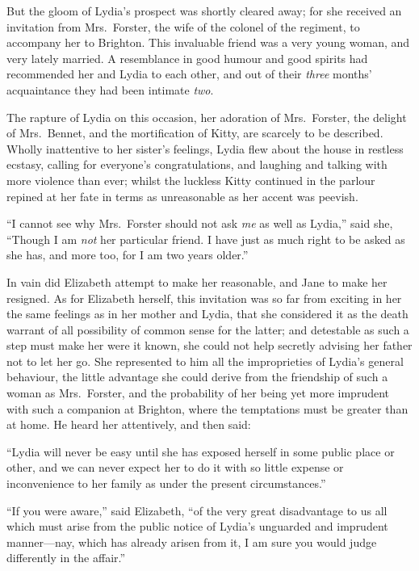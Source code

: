 \documentclass[12pt,english]{book}
\begin{document}
But the gloom of Lydia's prospect was shortly cleared away; for she
received an invitation from Mrs.\ Forster, the wife of the colonel
of the regiment, to accompany her to Brighton. This invaluable friend
was a very young woman, and very lately married. A resemblance in
good humour and good spirits had recommended her and Lydia to each
other, and out of their \textit{three} months' acquaintance they had
been intimate \textit{two}.

The rapture of Lydia on this occasion, her adoration of Mrs.\ Forster,
the delight of Mrs.\ Bennet, and the mortification of Kitty, are
scarcely to be described. Wholly inattentive to her sister's feelings,
Lydia flew about the house in restless ecstasy, calling for everyone's
congratulations, and laughing and talking with more violence than
ever; whilst the luckless Kitty continued in the parlour repined at
her fate in terms as unreasonable as her accent was peevish.

{}``I cannot see why Mrs.\ Forster should not ask \textit{me} as
well as Lydia,'' said she, {}``Though I am \textit{not} her particular
friend. I have just as much right to be asked as she has, and more
too, for I am two years older.''

In vain did Elizabeth attempt to make her reasonable, and Jane to
make her resigned. As for Elizabeth herself, this invitation was so
far from exciting in her the same feelings as in her mother and Lydia,
that she considered it as the death warrant of all possibility of
common sense for the latter; and detestable as such a step must make
her were it known, she could not help secretly advising her father
not to let her go. She represented to him all the improprieties of
Lydia's general behaviour, the little advantage she could derive from
the friendship of such a woman as Mrs.\ Forster, and the probability
of her being yet more imprudent with such a companion at Brighton,
where the temptations must be greater than at home. He heard her attentively,
and then said:

{}``Lydia will never be easy until she has exposed herself in some
public place or other, and we can never expect her to do it with so
little expense or inconvenience to her family as under the present
circumstances.''

{}``If you were aware,'' said Elizabeth, {}``of the very great
disadvantage to us all which must arise from the public notice of
Lydia's unguarded and imprudent manner\mbox{---}nay, which has already
arisen from it, I am sure you would judge differently in the affair.''
\end{document}
